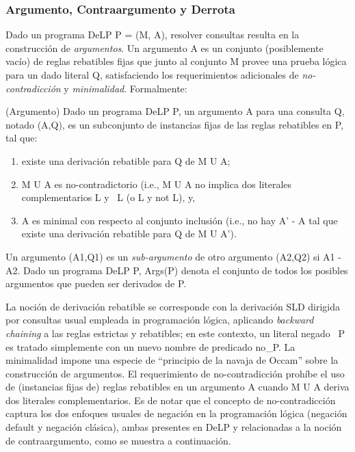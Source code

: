 
\subsubsection{Argumento, Contraargumento y Derrota}

Dado un programa DeLP P = (M, A), resolver consultas resulta en la construcción de \textit{argumentos}.
Un argumento A es un conjunto (posiblemente vacío) de reglas rebatibles fijas que junto al conjunto M
provee una prueba lógica para un dado literal Q, satisfaciendo los requerimientos adicionales de 
\textit{no-contradicción} y \textit{minimalidad}. Formalmente:

\begin{definicion}(Argumento)
	Dado un programa DeLP P, un argumento A para una consulta Q, notado (A,Q), es un subconjunto de 
	instancias fijas de las reglas rebatibles en P, tal que:
	
	\begin{enumerate}[(1)]
		\item existe una derivación rebatible para Q de M U A;
		\item M U A es no-contradictorio (i.e., M U A no implica dos literales complementarios L y ~L
		(o L y not L), y,		
		\item A es minimal con respecto al conjunto inclusión (i.e., no hay A' - A tal que existe una 
		derivación rebatible para Q de M U A').
	\end{enumerate}
	
\end{definicion}

Un argumento (A1,Q1) es un \textit{sub-argumento} de otro argumento (A2,Q2) si A1 - A2. Dado un programa
DeLP P, Args(P) denota el conjunto de todos los posibles argumentos que pueden ser derivados de P.

La noción de derivación rebatible  se corresponde con la derivación SLD dirigida por consultas usual
empleada in programación lógica, aplicando \textit{backward chaining} a las reglas estrictas y rebatibles;
en este contexto, un literal negado ~P es tratado simplemente con un nuevo nombre de predicado no\_P. La 
minimalidad impone una especie de ``principio de la navaja de Occam'' sobre la construcción de argumentos.
El requerimiento de no-contradicción prohíbe el uso de (instancias fijas de) reglas rebatibles en un 
argumento A cuando M U A deriva dos literales complementarios. Es de notar que el concepto de no-contradicción
captura los dos enfoques usuales de negación en la programación lógica (negación default y negación clásica),
ambas presentes en DeLP y relacionadas a la noción de contraargumento, como se muestra a continuación.
